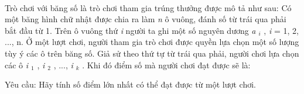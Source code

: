  

Trò chơi với băng số là trò chơi tham gia trúng thưởng được mô tả như sau: Có một băng hình chữ nhật được chia ra làm \emph{ n } ô vuông, đánh số từ trái qua phải bắt đầu từ 1. Trên ô vuông thứ \emph{ i } người ta ghi một số nguyên dương \emph{ a $_ i $} , \emph{ i } = 1, 2, ..., n. Ở một lượt chơi, người tham gia trò chơi được quyền lựa chọn một số lượng tùy ý các ô trên băng số. Giả sử theo thứ tự từ trái qua phải, người chơi lựa chọn các ô \emph{ i $_ 1 $} , \emph{ i $_ 2 $} , ..., \emph{ i $_ k $} . Khi đó điểm số mà người chơi đạt được sẽ là:

Yêu cầu: Hãy tính số điểm lớn nhất có thể đạt được từ một lượt chơi.